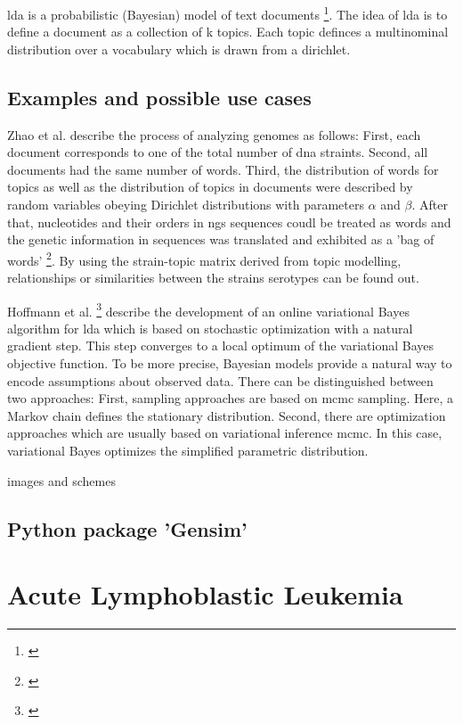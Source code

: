 \gls{lda} is a probabilistic (Bayesian) model of text documents \footnote{\autocite{hoffmann_2010}}. The idea of \gls{lda} is to define a document as a collection of k topics. Each topic definces a multinominal distribution over a vocabulary which is drawn from a dirichlet. 
 
\section{Examples and possible use cases}\label{lda_examples}

Zhao et al. describe the process of analyzing genomes as follows: First, each document corresponds to one of the total number of \gls{dna} straints. Second, all documents had the same number of words. Third, the distribution of words for topics as well as the distribution of topics in documents were described by random variables obeying Dirichlet distributions with parameters $\alpha$ and $\beta$. After that, nucleotides and their orders in \gls{ngs} sequences coudl be treated as words and the genetic information in sequences was translated and exhibited as a 'bag of words'  \footnote{\autocite{zhao_2016}}. By using the strain-topic matrix derived from topic modelling, relationships or similarities between the strains serotypes can be found out. 

Hoffmann et al. \footnote{\autocite{hoffmann_2010}} describe the development of an online variational Bayes algorithm for \gls{lda} which is based on stochastic optimization with a natural gradient step. This step converges to a local optimum of the variational Bayes objective function.
To be more precise, Bayesian models provide a natural way to encode assumptions about observed data.
There can be distinguished between two approaches: First, sampling approaches are based on \gls{mcmc} sampling. Here, a Markov chain defines the stationary distribution.
Second, there are optimization approaches which are usually based on variational inference \gls{mcmc}. In this case, variational Bayes optimizes the simplified parametric distribution.     

 
images and schemes
\section{Python package 'Gensim'}\label{gensim}
              
\chapter{Acute Lymphoblastic Leukemia}\label{all}
